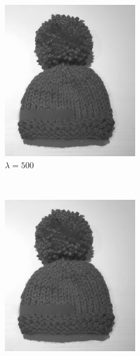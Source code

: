 \documentclass{paper}
\begin{document}
\begin{figure}[ht]
\begin{subfigure}[h]{0.3\textwidth}
    \includegraphics[width=\textwidth]{hat-iter10000-lambda500-alpha0_001}
    \caption*{$\lambda = 500$}
 \end{subfigure}
 ~
 \begin{subfigure}[h]{0.3\textwidth}
    \centering
    \includegraphics[width=\textwidth]{hat-iter10000-lambda850-alpha0_001}

\end{subfigure}
\end{figure}
\end{document}
